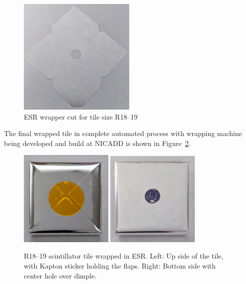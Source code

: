 \begin{figure}[!ht]
  \centering
  \includegraphics[width=0.5\textwidth]{figures/hgcal/esr_wrapper.jpg}
  \caption[ESR wrapper cut for tile size R18--19]
  {ESR wrapper cut for tile size R18--19}%
  \label{fig:hgcal-esr-wrapper}
\end{figure}

The final wrapped tile in complete automated process
with wrapping machine being developed and build at \gls{NICADD}
is shown in Figure~\ref{fig:hgcal-scintillator-tile-wrapped}.

\begin{figure}[!ht]
  \centering
  \includegraphics[width=0.4\textwidth]{figures/hgcal/wrapped_tile_up.jpg}
  \includegraphics[width=0.4\textwidth]{figures/hgcal/wrapped_tile_down.jpg}
  \caption[R18--19 scintillator tile wrapped in ESR]
  {R18--19 scintillator tile wrapped in ESR\@. Left: Up side of the tile, with
    Kapton sticker holding the flaps. Right: Bottom side with center hole
    over dimple.}%
  \label{fig:hgcal-scintillator-tile-wrapped}
\end{figure}

